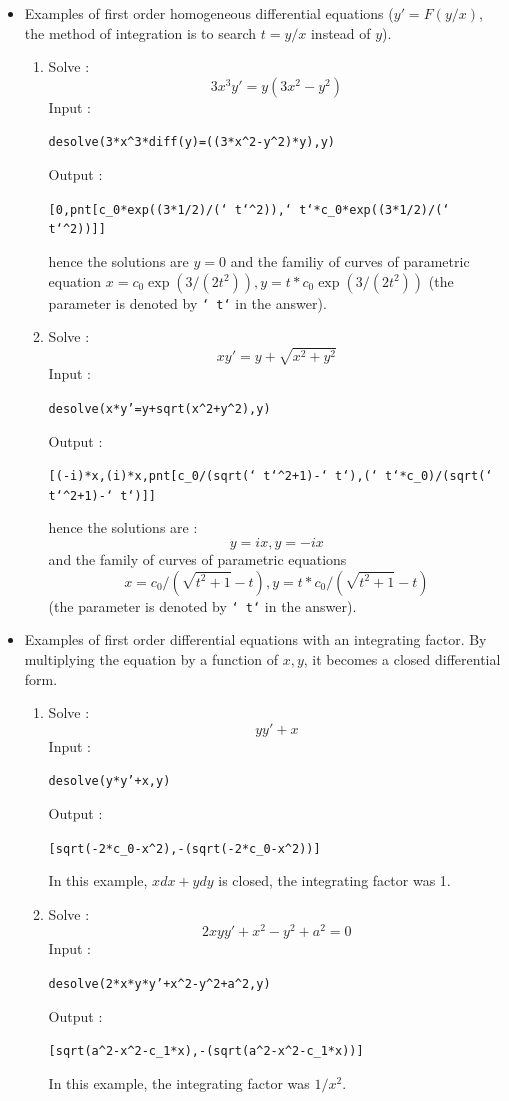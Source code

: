 \documentclass[a4paper,11pt]{book}
\begin{document}
\begin{itemize}
\item Examples of first order homogeneous differential equations ($y'=F(y/x)$,
the method of integration is to search $t=y/x$ instead of $y$).
\begin{enumerate}
\item 
Solve :
$$3x^3y'=y(3x^2-y^2)$$
Input :
\begin{center}{\tt desolve(3*x\verb|^|3*diff(y)=((3*x\verb|^|2-y\verb|^|2)*y),y)}\end{center}
Output :
\begin{center}{\tt [0,pnt[c\_0*exp((3*1/2)/(` t`\verb|^|2)),` t`*c\_0*exp((3*1/2)/(` t`\verb|^|2))]]}\end{center}
hence the solutions are $y=0$ and the familiy of curves of parametric
equation $x=c_0\exp(3/(2t^2)), y=t*c_0\exp(3/(2t^2))$ 
(the parameter is denoted by {\tt ` t`} in the answer).
\item
Solve :
$$xy'=y+\sqrt{x^2+y^2}$$
Input :
\begin{center}{\tt desolve(x*y'=y+sqrt(x\verb|^|2+y\verb|^|2),y)}\end{center}
Output  :
\begin{center}{\tt [(-i)*x,(i)*x,pnt[c\_0/(sqrt(` t`\verb|^|2+1)-` t`),(` t`*c\_0)/(sqrt(` t`\verb|^|2+1)-` t`)]]}\end{center}
hence the solutions are  :
$$y=ix,y=-ix$$
 and the family of curves of parametric equations
$$x=c_0/(\sqrt{t^2+1}-t), y=t*c_0/(\sqrt{t^2+1}-t)$$ 
(the parameter is denoted by {\tt ` t`} in the answer).
\end{enumerate}


\item Examples of first order differential equations with an 
integrating factor. By multiplying the equation by a function of $x,y$,
it becomes a closed differential form.
\begin{enumerate}
\item 
Solve :
$$yy'+x$$
Input :
\begin{center}{\tt desolve(y*y'+x,y)}\end{center}
Output  :
\begin{center}{\tt [sqrt(-2*c\_0-x\verb|^|2),-(sqrt(-2*c\_0-x\verb|^|2))]}\end{center}
In this example, $xdx+ydy$ is closed, the integrating factor was 1.
\item
Solve :
$$2xyy'+x^2-y^2+a^2=0$$
Input :
\begin{center}{\tt desolve(2*x*y*y'+x\verb|^|2-y\verb|^|2+a\verb|^|2,y)}\end{center}
Output  :
\begin{center}{\tt [sqrt(a\verb|^|2-x\verb|^|2-c\_1*x),-(sqrt(a\verb|^|2-x\verb|^|2-c\_1*x))]}\end{center}
In this example, the integrating factor was $1/x^2$.
\end{enumerate}


\end{itemize}
\end{document}
